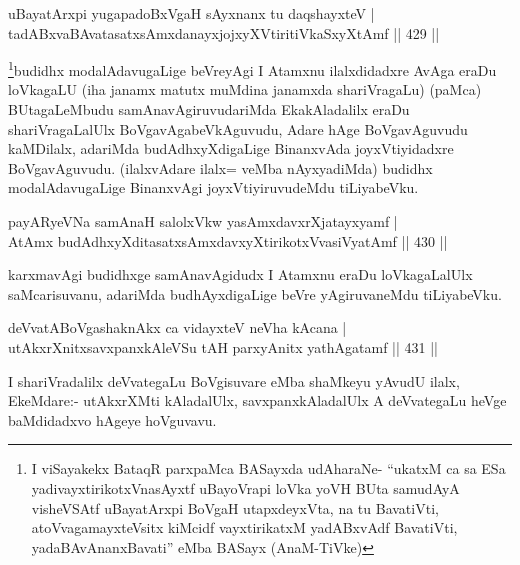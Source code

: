 \begin{shl}
uBayatArxpi yugapadoBxVgaH sAyxnanx tu daqshayxteV | \\
tadABxvaBAvatasatxsAmxdanayxjojxyXVtiritiVkaSxyXtAmf \hfill||  429 ||  
\end{shl}

\begin{artha}
\footnote[1]{I viSayakekx BataqR parxpaMca BASayxda udAharaNe- ``ukatxM ca sa ESa yadivayxtirikotxVnasAyxtf uBayoVrapi loVka yoVH BUta samudAyA visheVSAtf uBayatArxpi BoVgaH utapxdeyxVta, na tu BavatiVti, atoV\s vagamayxteV\s sitx kiMcidf vayxtirikatxM yadABxvAdf BavatiVti, yadaBAvAnanxBavati'' eMba BASayx (AnaM-TiVke)}budidhx modalAdavugaLige beVreyAgi I Atamxnu ilalxdidadxre AvAga eraDu loVkagaLU (iha janamx matutx muMdina janamxda shariVragaLu) (paMca) BUtagaLeMbudu samAnavAgiruvudariMda EkakAladalilx eraDu shariVragaLalUlx BoVgavAgabeVkAguvudu, Adare hAge BoVgavAguvudu kaMDilalx, adariMda budAdhxyXdigaLige BinanxvAda joyxVtiyidadxre BoVgavAguvudu. (ilalxvAdare ilalx= veMba nAyxyadiMda) budidhx modalAdavugaLige BinanxvAgi joyxVtiyiruvudeMdu tiLiyabeVku.
\end{artha}

\begin{shl}
payARyeVNa samAnaH salolxVkw yasAmxdavxrXjatayxyamf | \\
AtAmx budAdhxyXditasatxsAmxdavxyXtirikotxV\s vasiVyatAmf \hfill||  430 || 
\end{shl}

\begin{artha}
karxmavAgi budidhxge samAnavAgidudx I Atamxnu eraDu loVkagaLalUlx saMcarisuvanu, adariMda budhAyxdigaLige beVre yAgiruvaneMdu tiLiyabeVku.
\end{artha}


\begin{shl}
deVvatABoVgashaknAkx ca vidayxteV neVha kAcana | \\
utAkxrXnitxsavxpanxkAleVSu tAH parxyAnitx yathAgatamf \hfill||  431 ||  
\end{shl}

\begin{artha}
I shariVradalilx deVvategaLu BoVgisuvare eMba shaMkeyu yAvudU ilalx, EkeMdare:- utAkxrXMti kAladalUlx, savxpanxkAladalUlx A deVvategaLu heVge baMdidadxvo hAgeye hoVguvavu.
\end{artha}


